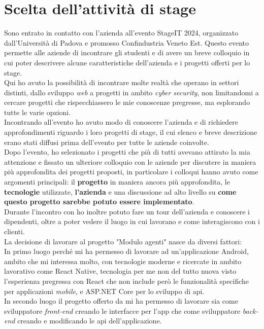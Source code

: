 \section{Scelta dell'attività di stage}
Sono entrato in contatto con l'azienda all'evento StageIT 2024, organizzato dall'Università di Padova e promosso Confindustria 
Veneto Est. Questo evento permette alle aziende di incontrare gli studenti e di avere un breve colloquio in cui poter 
descrivere alcune caratteristiche dell'azienda e i progetti offerti per lo stage.\\
Qui ho avuto la possibilità di incontrare molte realtà che operano in settori distinti, dallo sviluppo \textit{web} a progetti in 
ambito \textit{cyber security}, non limitandomi a cercare progetti che rispecchiassero le mie conoscenze pregresse, ma esplorando tutte le 
varie opzioni.\\
Incontrando {\company} all'evento ho avuto modo di conoscere l'azienda e di richiedere approfondimenti riguardo i loro progetti di 
stage, il cui elenco e breve descrizione erano stati diffusi prima dell'evento per tutte le aziende coinvolte.\\
Dopo l'evento, ho selezionato i progetti che più di tutti avevano attirato la mia attenzione e fissato un ulteriore colloquio con 
le aziende per discutere in maniera più approfondita dei progetti proposti, in particolare i colloqui hanno avuto come argomenti 
principali: il \textbf{progetto} in maniera ancora più approfondita, le \textbf{tecnologie} utilizzate, \textbf{l'azienda} e una discussione ad alto livello 
su \textbf{come questo progetto sarebbe potuto essere implementato}.\\
Durante l'incontro con {\company} ho inoltre potuto fare un tour dell'azienda e conoscere i dipendenti, oltre a poter 
vedere il luogo in cui lavorano e come interagiscono con i clienti.\\
La decisione di lavorare al progetto "Modulo agenti" nasce da diversi fattori:\\
In primo luogo perché mi ha permesso di lavorare ad un'applicazione Android, ambito che mi interessa molto, con tecnologie 
moderne e ricercate in ambito lavorativo come React Native, tecnologia per me non del tutto nuova visto l'esperienza 
pregressa con React che non include però le funzionalità specifiche per applicazioni \textit{mobile}, e ASP.NET Core per 
lo sviluppo di \gls{api}.\\
In secondo luogo il progetto offerto da {\company} mi ha permesso di lavorare sia come sviluppatore \textit{front-end} 
creando le interfacce per l'app che come sviluppatore \textit{back-end} creando e modificando le \gls{api} dell'applicazione. 
